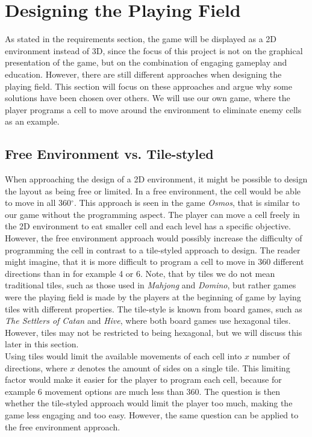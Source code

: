 \section{Designing the Playing Field}
\label{sec:designing_playing_field}
As stated in the requirements section, the game will be displayed as a 2D environment instead of 3D, since the focus of this project is not on the graphical presentation of the game, but on the combination of engaging gameplay and education. However, there are still different approaches when designing the playing field. This section will focus on these approaches and argue why some solutions have been chosen over others. We will use our own game, where the player programs a cell to move around the environment to eliminate enemy cells as an example.

\subsection{Free Environment vs. Tile-styled}

When approaching the design of a 2D environment, it might be possible to design the layout as being free or limited.
In a free environment, the cell would be able to move in all 360$^{\circ}$.
This approach is seen in the game \textit{Osmos}, that is similar to our game without the programming aspect.
The player can move a cell freely in the 2D environment to eat smaller cell and each level has a specific objective.
However, the free environment approach would possibly increase the difficulty of programming the cell in contrast to a tile-styled approach to design.
The reader might imagine, that it is more difficult to program a cell to move in 360 different directions than in for example 4 or 6.
Note, that by tiles we do not mean traditional tiles, such as those used in \textit{Mahjong} and \textit{Domino}, but rather games were the playing field is made by the players at the beginning of game by laying tiles with different properties.
The tile-style is known from board games, such as \textit{The Settlers of Catan} and \textit{Hive}, where both board games use hexagonal tiles.
However, tiles may not be restricted to being hexagonal, but we will discuss this later in this section.\\

Using tiles would limit the available movements of each cell into $x$ number of directions, where $x$ denotes the amount of sides on a single tile. This limiting factor would make it easier for the player to program each cell, because for example $6$ movement options are much less than $360$. The question is then whether the tile-styled approach would limit the player too much, making the game less engaging and too easy. However, the same question can be applied to the free environment approach.\\


